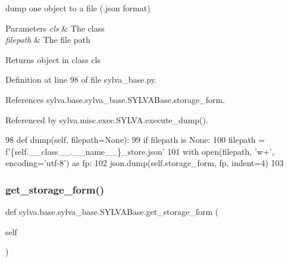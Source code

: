 dump one object to a file (.json format) 


\begin{DoxyParams}{Parameters}
{\em cls} & The class \\
\hline
{\em filepath} & The file path\\
\hline
\end{DoxyParams}
\begin{DoxyReturn}{Returns}
object in class cls 
\end{DoxyReturn}


Definition at line 98 of file sylva\+\_\+base.\+py.



References sylva.\+base.\+sylva\+\_\+base.\+S\+Y\+L\+V\+A\+Base.\+storage\+\_\+form.



Referenced by sylva.\+misc.\+exec.\+S\+Y\+L\+V\+A.\+execute\+\_\+dump().


\begin{DoxyCode}
98     \textcolor{keyword}{def }dump(self, filepath=None):
99         \textcolor{keywordflow}{if} filepath \textcolor{keywordflow}{is} \textcolor{keywordtype}{None}:
100             filepath = f\textcolor{stringliteral}{'\{self.\_\_class\_\_.\_\_name\_\_\}\_store.json'}
101         with open(filepath, \textcolor{stringliteral}{'w+'}, encoding=\textcolor{stringliteral}{'utf-8'}) \textcolor{keyword}{as} fp:
102             json.dump(self.storage\_form, fp, indent=4)
103 
\end{DoxyCode}
\mbox{\label{classsylva_1_1base_1_1sylva__base_1_1_s_y_l_v_a_base_a8d94af12d912b69a5c8ada74debce019}} 
\subsubsection{\texorpdfstring{get\+\_\+storage\+\_\+form()}{get\_storage\_form()}}
{\footnotesize\ttfamily def sylva.\+base.\+sylva\+\_\+base.\+S\+Y\+L\+V\+A\+Base.\+get\+\_\+storage\+\_\+form (\begin{DoxyParamCaption}\item[{}]{self }\end{DoxyParamCaption})}



